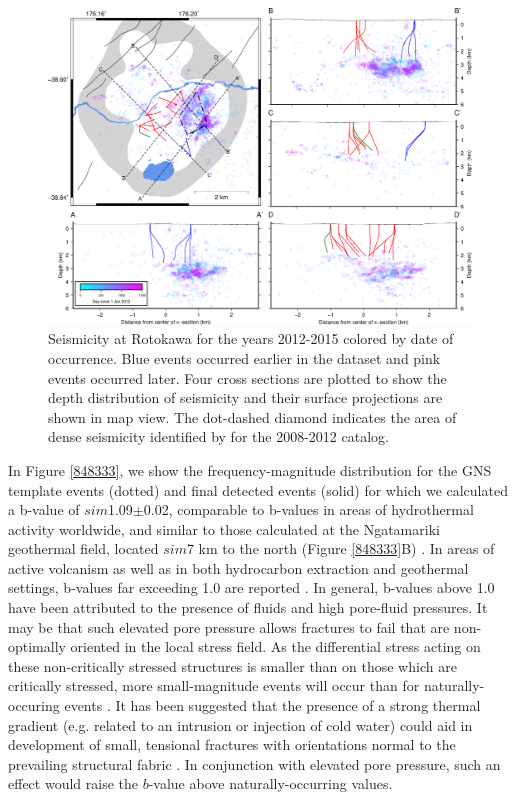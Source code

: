 \begin{figure}[h!]
\begin{center}
\includegraphics[width=1.00\columnwidth]{Chapter_4_Rot/figures/merc_Rot_dets_just_GC/merc_Rot_dets_just_GC_original}
\caption{{Seismicity at Rotokawa for the years 2012-2015 colored by date of
occurrence. Blue events occurred earlier in the dataset and pink events
occurred later. Four cross sections are plotted to show the depth
distribution of seismicity and their surface projections are shown in
map view. The dot-dashed diamond indicates the area of dense seismicity
identified by \protect\citealp{Sherburn_2015,Sewell_2015WGC} for the 2008-2012 catalog.
{\label{349058}}%
}}
\end{center}
\end{figure}

In Figure \ref{848333}, we show the frequency-magnitude distribution for the GNS template events (dotted) and final detected events (solid) for which we calculated a b-value of $sim${1.09}$\pm$0.02, comparable to b-values in areas of hydrothermal activity worldwide, and similar to those calculated at the Ngatamariki geothermal field, located $sim${7} km to the north (Figure \ref{848333}B) \citep[e.g.][]{Bachmann_2012,Wiemer_1997,Dinske_2012,j2019}. In areas of active volcanism as well as in both hydrocarbon extraction and geothermal settings, b-values far exceeding 1.0 are reported  \citep{Dinske_2012,Shapiro_2011}. In general, b-values above 1.0 have been attributed to the presence of fluids and high pore-fluid pressures. It may be that such elevated pore pressure allows fractures to fail that are non-optimally oriented in the local stress field. As the differential stress acting on these non-critically stressed structures is smaller than on those which are critically stressed, more small-magnitude events will occur than for naturally-occuring events \citep{Bachmann_2012}. It has been suggested that the presence of a strong thermal gradient (e.g. related to an intrusion or injection of cold water) could aid in development of small, tensional fractures with orientations normal to the prevailing structural fabric \citep{Warren_1970}. In conjunction with elevated pore pressure, such an effect would raise the $b$-value above naturally-occurring values.

